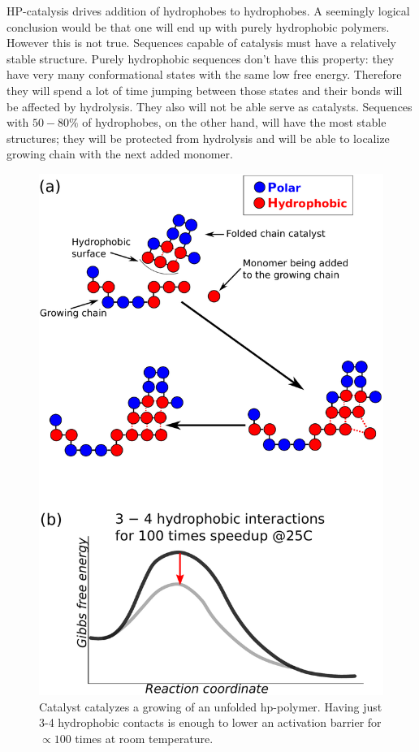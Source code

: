\documentclass[journal=jacsat,manuscript=article,layout=twocolumn]{achemso}
\begin{document}
HP-catalysis drives addition of hydrophobes to hydrophobes. A seemingly logical conclusion would 
be that one will end up with purely hydrophobic polymers. However this is not true. Sequences 
capable of catalysis must have a relatively stable structure. Purely hydrophobic sequences don't 
have this property: they have very many conformational states with the same low free energy. 
Therefore they will spend a lot of time jumping between those states and their bonds will be 
affected by hydrolysis. They also will not be able serve as catalysts. Sequences with $50-80\%$ 
of hydrophobes, on the other hand, will have the most stable structures; they will 
be protected from hydrolysis and will be able to localize growing chain with the next added 
monomer.
\begin{figure}[h!]
  \centering
  \includegraphics[width=0.9\columnwidth]{pictures/hp-catalysis.pdf} 
  \caption{Catalyst catalyzes a growing of an unfolded hp-polymer. 
           Having just 3-4 hydrophobic contacts is enough to lower an 
           activation barrier for $\propto 100$ times at room 
           temperature.}
  \label{fig:hp-catalysis}
\end{figure}
\end{document}
